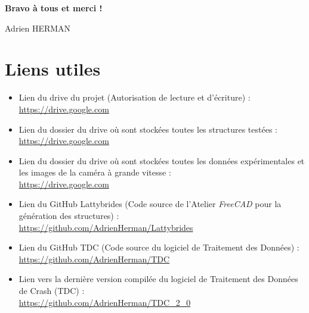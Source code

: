 \documentclass[a4paper]{article}
\begin{document}
	\begin{flushright}
		\textbf{\large Bravo à tous et merci !}
		
		Adrien HERMAN
	\end{flushright}
	
	\vspace{3cm}
	
	\section*{Liens utiles}
	\begin{itemize}
		\item Lien du drive du projet (Autorisation de lecture et d'écriture) :\\ \href{https://drive.google.com/drive/folders/1Y3JJd3HjbAqBD-ykjscEf51ELvaYXhEQ?usp=sharing}{https://drive.google.com}
		\item Lien du dossier du drive où sont stockées toutes les structures testées :\\
		\href{https://drive.google.com/drive/folders/1Dxy5Yaq-WHseOIPNWpTo1YhIdbHROOMq?usp=drive_link}{https://drive.google.com}
		\item Lien du dossier du drive où sont stockées toutes les données expérimentales et les images de la caméra à grande vitesse :\\
		\href{https://drive.google.com/drive/folders/1GixQ5m0--2UXGmWGoiHR0oR_ZuMvKeyD?usp=drive_link}{https://drive.google.com}
		\item Lien du GitHub Lattybrides (Code source de l'Atelier \textit{FreeCAD} pour la génération des structures) :\\ \href{https://github.com/AdrienHerman/Lattybrides/tree/main}{https://github.com/AdrienHerman/Lattybrides}
		\item Lien du GitHub TDC (Code source du logiciel de Traitement des Données) :\\ \href{https://github.com/AdrienHerman/TDC-Traitement_des_Donnees_de_Crash}{https://github.com/AdrienHerman/TDC}
		\item Lien vers la dernière version compilée du logiciel de Traitement des Données de Crash (TDC) :\\ \href{https://github.com/AdrienHerman/TDC-Traitement_des_Donnees_de_Crash/releases/tag/TDC_2_2}{https://github.com/AdrienHerman/TDC\_2\_0}
	\end{itemize}
	
	\newpage
	\renewcommand*\contentsname{Table des matières}
	\tableofcontents
	\newpage
	
\end{document}
